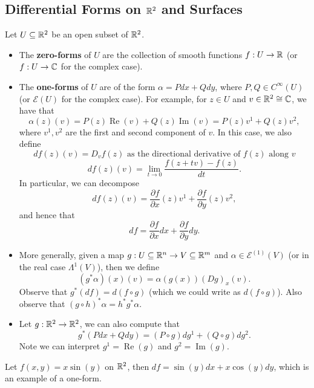 \documentclass{article}
\begin{document}
{\subsection{Differential Forms on $\mathbb{R}^2$ and Surfaces}


\begin{definition}
Let $U \subseteq \mathbb{R}^2$ be an open subset of $\mathbb{R}^2$.
\begin{itemize}
    \item The \textbf{zero-forms} of $U$ are the collection of smooth functions $f: U \to \mathbb{R}$ (or $f: U \to \mathbb{C}$ for the complex case).
    \item The \textbf{one-forms} of $U$ are of the form $\alpha = P dx + Q dy$, where $P, Q \in C^\infty(U)$ (or $\mathcal{E}(U)$ for the complex case). For example, for $z \in U$ and $v \in \mathbb{R}^2 \cong \mathbb{C}$, we have that
    \[\alpha(z)(v) = P(z) \operatorname{Re}(v) + Q(z) \operatorname{Im}(v) = P(z) v^1 + Q(z) v^2,\]
    where $v^1, v^2$ are the first and second component of $v$. In this case, we also define
    \[df(z)(v) = D_v f(z) \text{ as the directional derivative of $f(z)$ along $v$} \]
    \[df(z)(v) = \lim_{t \to 0} \frac{f(z + tv) - f(z)}{dt}.\]
    In particular, we can decompose
    \[df(z)(v) = \frac{\partial f}{\partial x}(z) v^1 + \frac{\partial f}{\partial y}(z) v^2,\]
    and hence that
    \[df = \frac{\partial f}{\partial x} dx + \frac{\partial f}{\partial y} dy.\]
    \item More generally, given a map $g: U \subseteq \mathbb{R}^n \to V \subseteq \mathbb{R}^m$ and $\alpha \in \mathcal{E}^{(1)}(V)$ (or in the real case $\Lambda^1(V)$), then we define
    \[(g^* \alpha)(x)(v) = \alpha(g(x))(Dg)_x(v).\]
    Observe that $g^*(df) = d(f \circ g)$ (which we could write as $d(f \circ g)$). Also observe that $(g \circ h)^* \alpha = h^* g^* \alpha$.
    \item Let $g: \mathbb{R}^2 \to \mathbb{R}^2$, we can also compute that
    \[g^*(P dx + Q dy) = (P \circ g) dg^1 + (Q \circ g) dg^2.\]
    Note we can interpret $g^1 = \operatorname{Re}(g)$ and $g^2 = \operatorname{Im}(g)$.
\end{itemize}
\end{definition}

\begin{example}
    Let $f(x, y) = x \sin(y)$ on $\mathbb{R}^2$, then $df = \sin(y) dx + x \cos(y) dy$, which is an example of a one-form.
\end{example}

}
\end{document}
